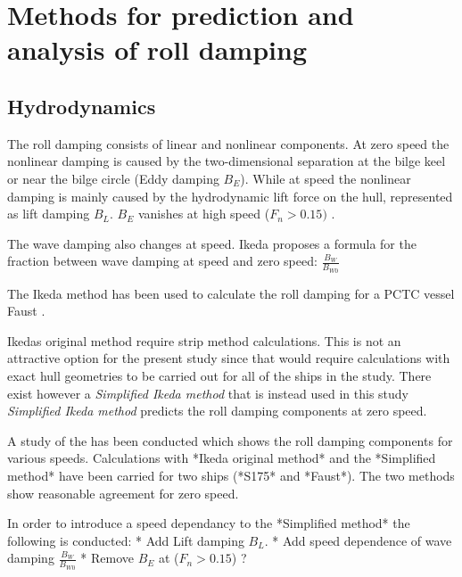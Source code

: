 \section{Methods for prediction and analysis of roll damping}
\label{se:methods_for_prediction_and_analysis}

\subsection{Hydrodynamics}
\label{se:hydrodynamics}
The roll damping consists of linear and nonlinear components. At zero speed the nonlinear damping is caused by the two-dimensional separation at the bilge keel or near the bilge circle (Eddy damping $B_E$). While at speed the nonlinear damping is mainly caused by the hydrodynamic lift force on the hull, represented as lift damping $B_L$. $B_E$ vanishes at high speed ($F_n>0.15)$ \cite{ikeda_components_1978}.

The wave damping also changes at speed. Ikeda \cite{ikeda_components_1978} proposes a formula for the fraction between wave damping at speed and zero speed: $\frac{B_W}{B_{W0}}$

The Ikeda method has been used to calculate the roll damping for a PCTC vessel Faust \cite{soder_assessment_2019}.



Ikedas original method require strip method calculations. This is not an attractive option for the present study since that would require calculations with exact hull geometries to be carried out for all of the ships in the study. There exist however a \emph{Simplified Ikeda method} \cite{kawahara_simple_2011} that is instead used in this study \emph{Simplified Ikeda method} predicts the roll damping components at zero speed.

A study of the has been conducted which shows the roll damping components for various speeds. Calculations with *Ikeda original method* and the *Simplified method* have been carried for two ships (*S175* and *Faust*). The two methods show reasonable agreement for zero speed.

In order to introduce a speed dependancy to the *Simplified method* the following is conducted:
* Add Lift damping $B_L$.
* Add speed dependence of wave damping $\frac{B_W}{B_{W0}}$
* Remove $B_E$ at ($F_n>0.15$) ?